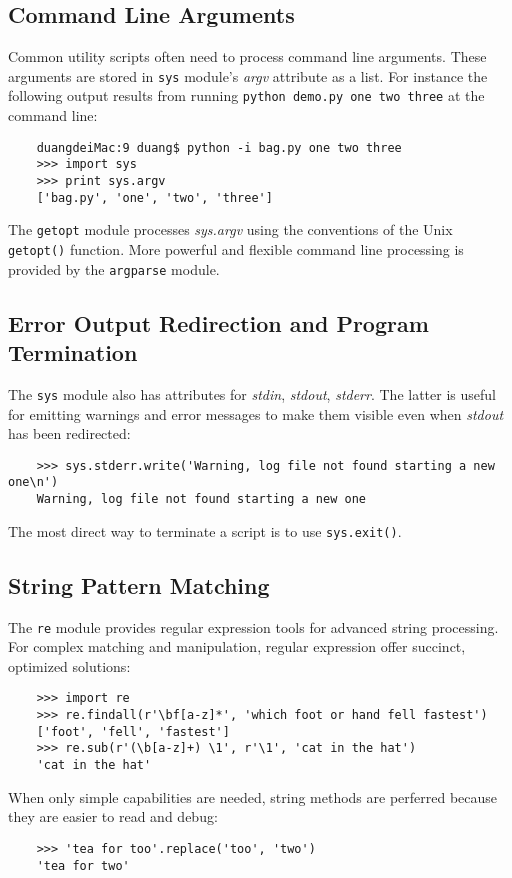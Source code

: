 \documentclass[UTF8]{article}
\begin{document}
\subsection{Command Line Arguments}
Common utility scripts often need to process command line arguments. These arguments are stored in
\texttt{sys} module's \emph{argv} attribute as a list. For instance the following output results
from running \texttt{python demo.py one two three} at the command line:
\begin{verbatim}
    duangdeiMac:9 duang$ python -i bag.py one two three
    >>> import sys
    >>> print sys.argv
    ['bag.py', 'one', 'two', 'three']
\end{verbatim}

The \texttt{getopt} module processes \emph{sys.argv} using the conventions of the Unix
\texttt{getopt()} function. More powerful and flexible command line processing is provided by the
\texttt{argparse} module.

\subsection{Error Output Redirection and Program Termination}
The \texttt{sys} module also has attributes for \emph{stdin}, \emph{stdout}, \emph{stderr}. The
latter is useful for emitting warnings and error messages to make them visible even when
\emph{stdout} has been redirected:
\begin{verbatim}
    >>> sys.stderr.write('Warning, log file not found starting a new one\n')
    Warning, log file not found starting a new one
\end{verbatim}

The most direct way to terminate a script is to use \texttt{sys.exit()}.

\subsection{String Pattern Matching}
The \texttt{re} module provides regular expression tools for advanced string processing. For
complex matching and manipulation, regular expression offer succinct, optimized solutions:
\begin{verbatim}
    >>> import re
    >>> re.findall(r'\bf[a-z]*', 'which foot or hand fell fastest')
    ['foot', 'fell', 'fastest']
    >>> re.sub(r'(\b[a-z]+) \1', r'\1', 'cat in the hat')
    'cat in the hat'
\end{verbatim}

When only simple capabilities are needed, string methods are perferred because they are easier to
read and debug:
\begin{verbatim}
    >>> 'tea for too'.replace('too', 'two')
    'tea for two'
\end{verbatim}
\end{document}

